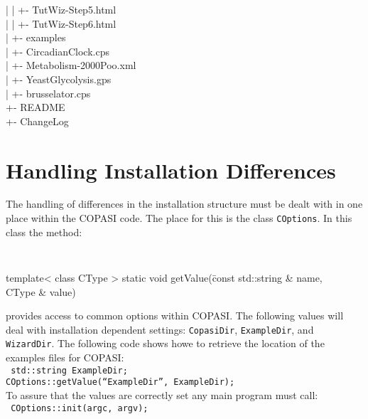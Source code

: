 \documentclass[12pt]{book}
\begin{document}
{\begin{tabbing}
 \> | \> \> | \> \> +- TutWiz-Step5.html \\
 \> | \> \> | \> \> +- TutWiz-Step6.html \\
 \> | \> \> +- examples \\
 \> | \> \> \> +- CircadianClock.cps \\
 \> | \> \> \> +- Metabolism-2000Poo.xml \\
 \> | \> \> \> +- YeastGlycolysis.gps \\
 \> | \> \> \> +- brusselator.cps \\
 \> +- README \\
 \> +- ChangeLog \\
\end{tabbing}
}

\section{Handling Installation Differences}
The handling of differences in the installation structure must be
dealt with in one place within the COPASI code. The place for this is
the class {\tt COptions}. In this class the method:
{\tt \scriptsize
\begin{tabbing}
template< class CType > static void getValue(\=const std::string \&
name, \\
\> CType \& value)
\end{tabbing}
}
\noindent
provides access to common options within COPASI. The following values
will deal with installation dependent settings:
{\tt CopasiDir}, {\tt ExampleDir}, and {\tt WizardDir}. The following code
shows howe to retrieve the location of the examples files for COPASI: \\
{\tt \scriptsize
\indent std::string ExampleDir; \\[-4 pt]
\indent COptions::getValue(``ExampleDir'', ExampleDir); \\
}
\noindent
To assure that the values are correctly set any main program must
call: \\
{\tt \scriptsize
\indent       COptions::init(argc, argv);
}
\end{document}
